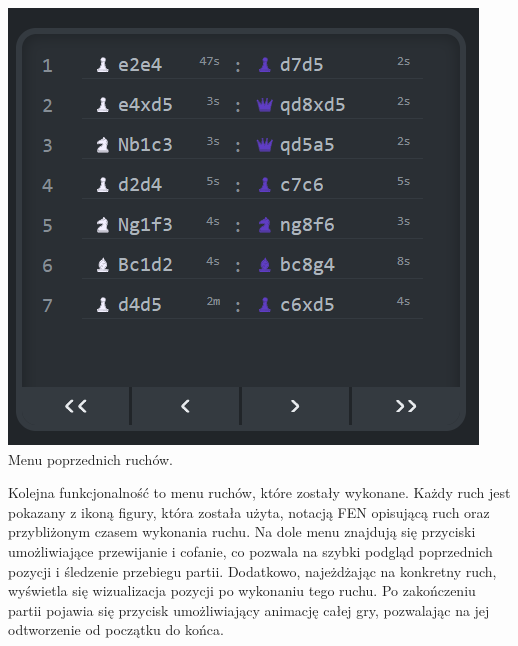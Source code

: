 \documentclass[12pt,a4paper]{article}
\begin{document}
\begin{minipage}[t]{0.45\textwidth} 
    \vspace{0pt} 
    \centering 
    \includegraphics[width=\linewidth]{images/ins_min_moves.png} 
    Menu poprzednich ruchów.
\end{minipage} 
\hfill 
\begin{minipage}[t]{0.45\textwidth} 
    \vspace{0pt} 
    \raggedright 
    Kolejna funkcjonalność to menu ruchów, które zostały wykonane. Każdy ruch jest pokazany z ikoną figury, która została użyta, notacją FEN opisującą ruch oraz przybliżonym czasem wykonania ruchu. Na dole menu znajdują się przyciski umożliwiające przewijanie i cofanie, co pozwala na szybki podgląd poprzednich pozycji i śledzenie przebiegu partii. Dodatkowo, najeżdżając na konkretny ruch, wyświetla się wizualizacja pozycji po wykonaniu tego ruchu. Po zakończeniu partii pojawia się przycisk umożliwiający animację całej gry, pozwalając na jej odtworzenie od początku do końca.
\end{minipage}

\vspace{1cm}
\end{document}
